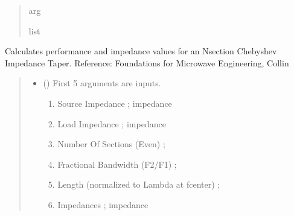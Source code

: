 \documentclass[letterpaper,10pt,english]{sphinxmanual}
\begin{document}
\begin{fulllineitems}
\begin{quote}
\begin{description}
\begin{itemize}
\end{itemize}

\sphinxAtStartPar
arg

\sphinxAtStartPar
list

\end{description}\end{quote}

\end{fulllineitems}


\begin{fulllineitems}
\label{\detokenize{components:components.Chebyshev_Taper_Impedance_Transformer}}
\pysigstartsignatures
{}
\pysigstopsignatures
\sphinxAtStartPar
Calculates performance and impedance values for an N\sphinxhyphen{}section Chebyshev Impedance Taper.
Reference:  Foundations for Microwave Engineering, Collin
\begin{quote}\begin{description}
\begin{itemize}
\item {} 
\sphinxAtStartPar
{} () \textendash{} 
\sphinxAtStartPar
First 5 arguments are inputs.
\begin{enumerate}
%
\item {} 
\sphinxAtStartPar
Source Impedance ; impedance

\item {} 
\sphinxAtStartPar
Load Impedance ; impedance

\item {} 
\sphinxAtStartPar
Number Of Sections (Even) ;

\item {} 
\sphinxAtStartPar
Fractional Bandwidth (F2/F1) ;

\item {} 
\sphinxAtStartPar
Length (normalized to Lambda at fcenter) ;

\item {} 
\sphinxAtStartPar
Impedances ; impedance


\end{enumerate}
\end{itemize}
\end{description}
\end{quote}
\end{fulllineitems}
\end{document}
